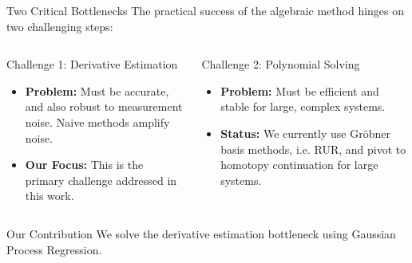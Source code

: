 \documentclass[aspectratio=169]{beamer}
\begin{document}
\begin{frame}{Two Critical Bottlenecks}
    \large
    The practical success of the algebraic method hinges on two challenging steps:
    \vspace{2em}

    \begin{columns}[T]
        \begin{column}{0.48\textwidth}
            \begin{block}{Challenge 1: Derivative Estimation}
                \small
                \begin{itemize}
                    \item \textbf{Problem:} Must be accurate, and also robust to measurement noise. Naive methods amplify noise.
                    \item \textbf{Our Focus:} This is the primary challenge addressed in this work.
                \end{itemize}
            \end{block}
        \end{column}
        \begin{column}{0.48\textwidth}
            \begin{block}{Challenge 2: Polynomial Solving}
                \small
                \begin{itemize}
                    \item \textbf{Problem:} Must be efficient and stable for large, complex systems.
                    \item \textbf{Status:} We currently use Gr\"obner basis methods, i.e. RUR, and pivot to homotopy continuation for large systems.
                \end{itemize}
            \end{block}
        \end{column}
    \end{columns}

    \vspace{1em}
    \begin{alertblock}{Our Contribution}
        \centering
        \normalsize
        We solve the derivative estimation bottleneck using Gaussian Process Regression.
    \end{alertblock}
\end{frame}
\end{document}
